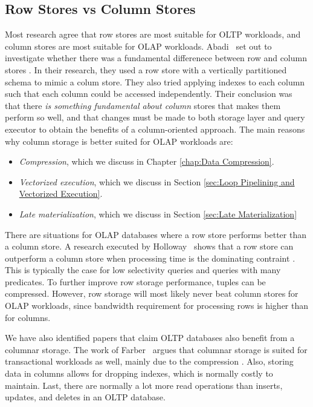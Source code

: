 \subsection{Row Stores vs Column Stores}
\label{sub:Row Stores vs Column Stores}
Most research agree that row stores are most suitable for OLTP workloads, and column stores are most suitable for OLAP workloads. Abadi \ea~set out to investigate whether there was a fundamental differenece between row and column stores \cite{Abadi2008-dd}. In their research, they used a row store with a vertically partitioned schema to mimic a colum store. They also tried applying indexes to each column such that each column could be accessed independently. Their conclusion was that there \textit{is something fundamental about column} stores that makes them perform so well, and that changes must be made to both storage layer and query executor to obtain the benefits of a column-oriented approach. The main reasons why column storage is better suited for OLAP workloads are:
\begin{itemize}
  \item \textit{Compression}, which we discuss in Chapter \ref{chap:Data Compression}.
  \item \textit{Vectorized execution}, which we discuss in Section \ref{sec:Loop Pipelining and Vectorized Execution}.
  \item \textit{Late materialization}, which we discuss in Section \ref{sec:Late Materialization}
\end{itemize}

There are situations for OLAP databases where a row store performs better than a column store. A research executed by Holloway \ea~shows that a row store can outperform a column store when processing time is the dominating contraint \cite{Holloway2008-rr}. This is typically the case for low selectivity queries and queries with many predicates. To further improve row storage performance, tuples can be compressed. However, row storage will most likely never beat column stores for OLAP workloads, since bandwidth requirement for processing rows is higher than for columns.


We have also identified papers that claim OLTP databases also benefit from a columnar storage. The work of Farber \ea~argues that columnar storage is suited for transactional workloads as well, mainly due to the compression \cite{Farber2012-vh}. Also, storing data in columns allows for dropping indexes, which is normally costly to maintain. Last, there are normally a lot more read operations than inserts, updates, and deletes in an OLTP database.

